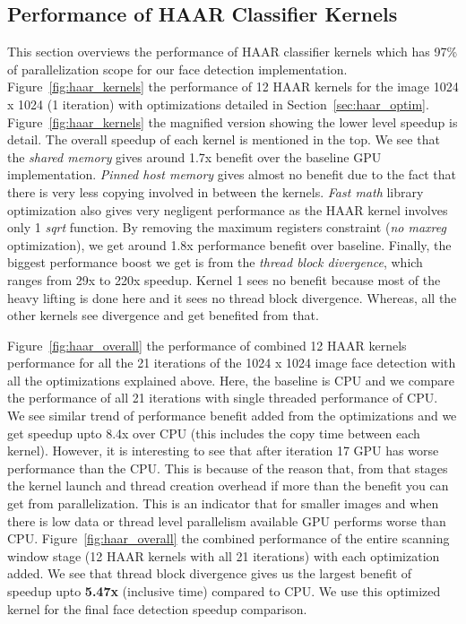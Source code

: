 \subsection{Performance of HAAR Classifier Kernels}
This section overviews the performance of HAAR classifier kernels which
has 97\% of parallelization scope for our face detection implementation.
Figure~\ref{fig:haar_kernels} \color{red}{a)} \color{black}{shows} the performance of 12 HAAR kernels for the image 1024 x 1024 (1 iteration) with optimizations 
detailed in Section~\ref{sec:haar_optim}.
Figure~\ref{fig:haar_kernels} \color{red}{b)} \color{black}{is} the magnified version showing the lower level speedup is detail. The overall speedup of each kernel
is mentioned in the top.
We see that the \emph{shared memory} gives around 1.7x benefit over the baseline GPU implementation. \emph{Pinned host memory} gives almost no benefit
due to the fact that there is very less copying involved in between the kernels. \emph{Fast math} library optimization also gives very negligent performance
as the HAAR kernel involves only 1 \textit{sqrt} function. By removing the maximum registers constraint (\emph{no maxreg} optimization), we get around
1.8x performance benefit over baseline. Finally, the biggest performance boost we get is from the \emph{thread block divergence}, which ranges from 29x to 220x speedup.
Kernel 1 sees no benefit because most of the heavy lifting is done here and it sees no thread block divergence. Whereas, all the other kernels see divergence and get benefited from that.


Figure~\ref{fig:haar_overall} \color{red}{a)} \color{black}{shows} the performance of combined 12 HAAR kernels performance for all the 21 iterations
of the 1024 x 1024 image face detection with all the optimizations explained above. Here, the baseline is CPU and we compare the performance of
all 21 iterations with single threaded performance of CPU. We see similar trend of performance benefit added from the optimizations and we get speedup upto 8.4x
over CPU (this includes the copy time between each kernel). However, it is interesting to see that after iteration 17 GPU has worse performance than the CPU. This is because of the
reason that, from that stages the kernel launch and thread creation overhead if more than the benefit you can get from parallelization. This is an indicator that for smaller images and
when there is low data or thread level parallelism available GPU performs worse than CPU.
Figure~\ref{fig:haar_overall} \color{red}{b)} \color{black}{shows} the combined performance of the entire scanning window stage (12 HAAR kernels with all 21 iterations) with each optimization added. 
We see that thread block divergence gives us the largest benefit of speedup upto \textbf{5.47x} (inclusive time) compared to CPU. We use this optimized kernel for the final face detection speedup comparison.


